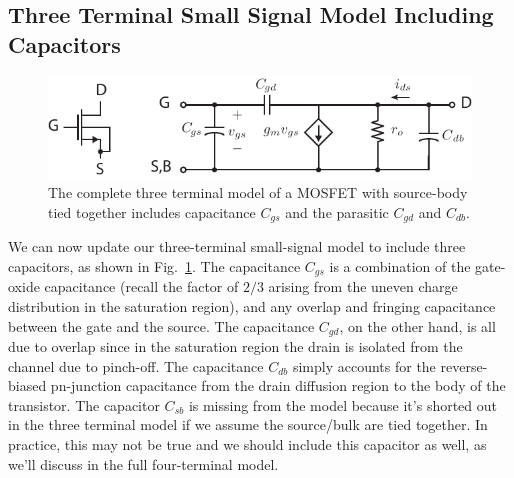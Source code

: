 \subsection{Three Terminal Small Signal Model Including Capacitors}
\begin{figure}[tb]
\begin{center}
\includegraphics[scale=1]{mos3term_ac}
\end{center}
\caption{The complete three terminal model of a MOSFET with source-body tied together includes  capacitance $C_{gs}$ and the parasitic $C_{gd}$ and $C_{db}$.}
\label{fig:mos3term_ac}
\end{figure}

We can now update our three-terminal small-signal model to include three capacitors, as shown in Fig.~\ref{fig:mos3term_ac}.  The capacitance $C_{gs}$ is a combination of the gate-oxide capacitance (recall the factor of $2/3$ arising from the uneven charge distribution in the saturation region), and any overlap and fringing capacitance between the gate and the source.  The capacitance $C_{gd}$, on the other hand, is all due to overlap since in the saturation region the drain is isolated from the channel due to pinch-off.  The capacitance $C_{db}$ simply accounts for the reverse-biased pn-junction capacitance from the drain diffusion region to the body of the transistor.  The capacitor $C_{sb}$ is missing from the model because it's shorted out in the three terminal model if we assume the source/bulk are tied together.  In practice, this may not be true and we should include this capacitor as well, as we'll discuss in the full four-terminal model.  

